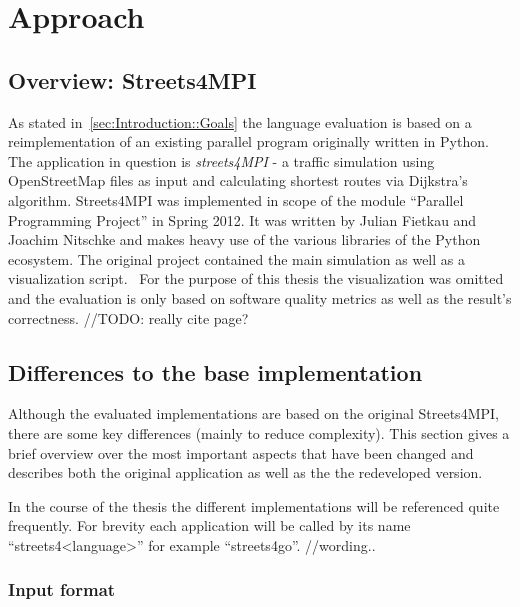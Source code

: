 \chapter{Approach}
\label{chap:Approach}


\section{Overview: Streets4MPI}
\label{sec:Approach::Overview}

As stated in~\autoref{sec:Introduction::Goals} the language evaluation is based on a reimplementation of an existing parallel program originally written in Python. The application in question is \textit{streets4MPI} - a traffic simulation using OpenStreetMap files as input and calculating shortest routes via Dijkstra's algorithm. Streets4MPI was implemented in scope of the module ``Parallel Programming Project'' in Spring 2012. It was written by Julian Fietkau and Joachim Nitschke and makes heavy use of the various libraries of the Python ecosystem. The original project contained the main simulation as well as a visualization script.~\cite[p.~3]{streets_report} For the purpose of this thesis the visualization was omitted and the evaluation is only based on software quality metrics as well as the result's correctness. //TODO: really cite page?

\section{Differences to the base implementation}
\label{sec:Approach::Differences}

Although the evaluated implementations are based on the original Streets4MPI, there are some key differences (mainly to reduce complexity). This section gives a brief overview over the most important aspects that have been changed and describes both the original application as well as the the redeveloped version.

In the course of the thesis the different implementations will be referenced quite frequently. For brevity each application will be called by its name ``streets4<language>'' for example ``streets4go''. //wording..

\subsection*{Input format}
\label{subsec:Approach::Differences::Input}

